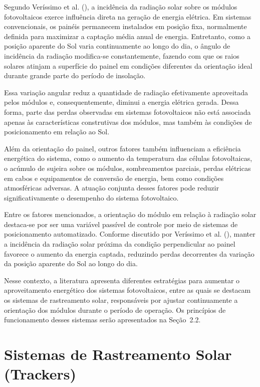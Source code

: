 Segundo Veríssimo et al. (\citeyear{verissimo2017}), a incidência da radiação solar sobre os módulos fotovoltaicos exerce influência direta na geração de energia elétrica. Em sistemas convencionais, os painéis permanecem instalados em posição fixa, normalmente definida para maximizar a captação média anual de energia. Entretanto, como a posição aparente do Sol varia continuamente ao longo do dia, o ângulo de incidência da radiação modifica-se constantemente, fazendo com que os raios solares atinjam a superfície do painel em condições diferentes da orientação ideal durante grande parte do período de insolação.

Essa variação angular reduz a quantidade de radiação efetivamente aproveitada pelos módulos e, consequentemente, diminui a energia elétrica gerada. Dessa forma, parte das perdas observadas em sistemas fotovoltaicos não está associada apenas às características construtivas dos módulos, mas também às condições de posicionamento em relação ao Sol.

Além da orientação do painel, outros fatores também influenciam a eficiência energética do sistema, como o aumento da temperatura das células fotovoltaicas, o acúmulo de sujeira sobre os módulos, sombreamentos parciais, perdas elétricas em cabos e equipamentos de conversão de energia, bem como condições atmosféricas adversas. A atuação conjunta desses fatores pode reduzir significativamente o desempenho do sistema fotovoltaico.

Entre os fatores mencionados, a orientação do módulo em relação à radiação solar destaca-se por ser uma variável passível de controle por meio de sistemas de posicionamento automatizado. Conforme discutido por Veríssimo et al. (\citeyear{verissimo2017}), manter a incidência da radiação solar próxima da condição perpendicular ao painel favorece o aumento da energia captada, reduzindo perdas decorrentes da variação da posição aparente do Sol ao longo do dia.

Nesse contexto, a literatura apresenta diferentes estratégias para aumentar o aproveitamento energético dos sistemas fotovoltaicos, entre as quais se destacam os sistemas de rastreamento solar, responsáveis por ajustar continuamente a orientação dos módulos durante o período de operação. Os princípios de funcionamento desses sistemas serão apresentados na Seção~2.2.

\section{Sistemas de Rastreamento Solar (Trackers)}

